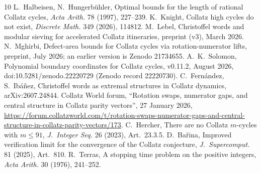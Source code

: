 \documentclass[11pt]{article}
\theoremstyle{plain}
\theoremstyle{definition}
\theoremstyle{remark}
\begin{document}
{\small
\begin{thebibliography}{10}
\setlength{\itemsep}{1pt plus 1pt}
 L.~Halbeisen, N.~Hungerbühler, Optimal bounds for the length of rational Collatz
  cycles, \emph{Acta Arith.} 78 (1997), 227--239.
 K.~Knight, Collatz high cycles do not exist, \emph{Discrete Math.} 349 (2026),
  114812.
 M.~Lebel, Christoffel words and modular sieving for accelerated Collatz
  itineraries, preprint (v3), March 2026.
 N.~Mghirbi, Defect-area bounds for Collatz cycles via rotation-numerator
  lifts, preprint, July 2026; an earlier version is Zenodo 21734655.
 A.~K.~Solomon, Polynomial boundary coordinates for Collatz cycles, v0.11.2,
  August 2026, doi:10.5281/zenodo.22220729 (Zenodo record 22220730).
 C.~Fernández, S.~Ibáñez, Christoffel words as extremal structures in Collatz
  dynamics, arXiv:2607.24844.
 Collatz World forum, ``Rotation swaps, numerator gaps, and central structure in
  Collatz parity vectors'', 27 January 2026,
  \url{https://forum.collatzworld.com/t/rotation-swaps-numerator-gaps-and-central-structure-in-collatz-parity-vectors/173}.
 C.~Hercher, There are no Collatz $m$-cycles with $m\le91$, \emph{J.\ Integer Seq.}
  26 (2023), Art.\ 23.3.5.
 D.~Bařina, Improved verification limit for the convergence of the Collatz conjecture,
  \emph{J.\ Supercomput.} 81 (2025), Art.\ 810.
 R.~Terras, A stopping time problem on the positive integers, \emph{Acta Arith.}
  30 (1976), 241--252.
\end{thebibliography}
}
\end{document}
